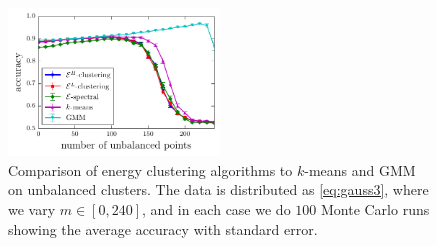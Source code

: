 \documentclass[aps,preprint,nofootinbib,floatfix]{revtex4-1}
\begin{document}
\begin{figure}
\includegraphics[width=0.5\textwidth]{normal_unbalanced.pdf}\vspace{-1em}
\caption{
\label{fig:unbalanced}
Comparison of energy clustering algorithms to $k$-means and GMM on
unbalanced clusters. The data is distributed as \eqref{eq:gauss3}, where
we vary $m \in [0, 240]$, and in each case we do $100$ Monte Carlo runs
showing the average accuracy with standard error.
}
\end{figure}
\end{document}
